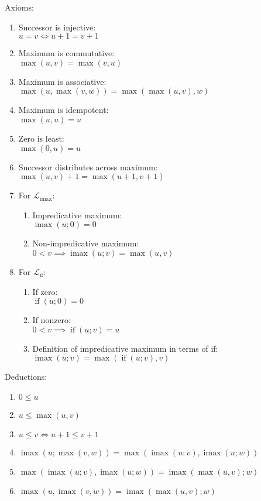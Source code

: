 \documentclass[11pt, twoside, reqno]{book}
\DeclareMathOperator{\imax}{imax}
\DeclareMathOperator{\ifop}{if}
\begin{document}
Axioms:
\label{alg-uni-laws}
\begin{enumerate}
\item Successor is injective:\\
  \(u = v \iff u+1 = v+1\)
\item Maximum is commutative:\\
  \(\max(u, v) = \max(v, u)\)
\item Maximum is associative:\\
  \(\max(u, \max(v, w)) = \max(\max(u, v), w)\)
\item Maximum is idempotent:\\
  \(\max(u, u) = u\)
\item Zero is least:\\
  \(\max(0, u) = u\)
\item Successor distributes across maximum:\\
  \(\max(u, v) + 1 = \max(u + 1, v + 1)\)
\item For \(\mathcal{L}_{\imax}\):
\begin{enumerate}
\item Impredicative maximum:\\
  \(\imax(u; 0) = 0\)
\item Non-impredicative maximum:\\
  \(0 < v \implies \imax(u; v) = \max(u, v)\)
\end{enumerate}
\item For \(\mathcal{L}_{\ifop}\):
\begin{enumerate}
\item If zero:\\
  \(\ifop(u; 0) = 0\)
\item If nonzero:\\
  \(0 < v \implies \ifop(u; v) = u\)
\item Definition of impredicative maximum in terms of if:\\
  \(\imax(u; v) = \max(\ifop(u; v), v)\)
\end{enumerate}
\end{enumerate}

Deductions:
\label{alg-uni-laws-more}
\begin{enumerate}
\item \(0 \le u\)
\item \(u \le \max(u, v)\)
\item \(u \le v \iff u+1 \le v+1\)
\item \(\imax(u; \max(v, w)) = \max(\imax(u; v), \imax(u; w))\)
\item \(\max(\imax(u; v), \imax(u; w)) = \imax(\max(u, v); w)\)
\item \(\imax(u, \imax(v, w)) = \imax(\max(u, v); w)\)
\end{enumerate}
\end{document}
